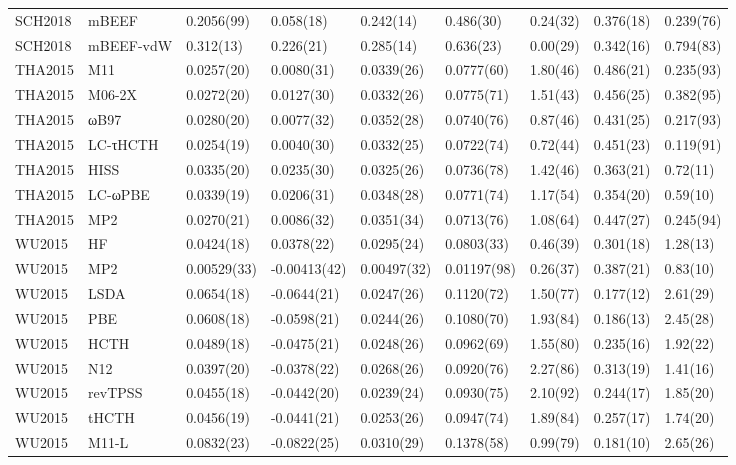\begin{table}[ht]
\begin{tabular}{lllllllll}
  SCH2018 & mBEEF & 0.2056(99) & 0.058(18) & 0.242(14) & 0.486(30) & 0.24(32) & 0.376(18) & 0.239(76) \\ 
  SCH2018 & mBEEF-vdW & 0.312(13) & 0.226(21) & 0.285(14) & 0.636(23) & 0.00(29) & 0.342(16) & 0.794(83) \\ 
  THA2015 & M11 & 0.0257(20) & 0.0080(31) & 0.0339(26) & 0.0777(60) & 1.80(46) & 0.486(21) & 0.235(93) \\ 
  THA2015 & M06-2X & 0.0272(20) & 0.0127(30) & 0.0332(26) & 0.0775(71) & 1.51(43) & 0.456(25) & 0.382(95) \\ 
  THA2015 & ωB97 & 0.0280(20) & 0.0077(32) & 0.0352(28) & 0.0740(76) & 0.87(46) & 0.431(25) & 0.217(93) \\ 
  THA2015 & LC-τHCTH & 0.0254(19) & 0.0040(30) & 0.0332(25) & 0.0722(74) & 0.72(44) & 0.451(23) & 0.119(91) \\ 
  THA2015 & HISS & 0.0335(20) & 0.0235(30) & 0.0325(26) & 0.0736(78) & 1.42(46) & 0.363(21) & 0.72(11) \\ 
  THA2015 & LC-ωPBE & 0.0339(19) & 0.0206(31) & 0.0348(28) & 0.0771(74) & 1.17(54) & 0.354(20) & 0.59(10) \\ 
  THA2015 & MP2 & 0.0270(21) & 0.0086(32) & 0.0351(34) & 0.0713(76) & 1.08(64) & 0.447(27) & 0.245(94) \\ 
  WU2015 & HF & 0.0424(18) & 0.0378(22) & 0.0295(24) & 0.0803(33) & 0.46(39) & 0.301(18) & 1.28(13) \\ 
  WU2015 & MP2 & 0.00529(33) & -0.00413(42) & 0.00497(32) & 0.01197(98) & 0.26(37) & 0.387(21) & 0.83(10) \\ 
  WU2015 & LSDA & 0.0654(18) & -0.0644(21) & 0.0247(26) & 0.1120(72) & 1.50(77) & 0.177(12) & 2.61(29) \\ 
  WU2015 & PBE & 0.0608(18) & -0.0598(21) & 0.0244(26) & 0.1080(70) & 1.93(84) & 0.186(13) & 2.45(28) \\ 
  WU2015 & HCTH & 0.0489(18) & -0.0475(21) & 0.0248(26) & 0.0962(69) & 1.55(80) & 0.235(16) & 1.92(22) \\ 
  WU2015 & N12 & 0.0397(20) & -0.0378(22) & 0.0268(26) & 0.0920(76) & 2.27(86) & 0.313(19) & 1.41(16) \\ 
  WU2015 & revTPSS & 0.0455(18) & -0.0442(20) & 0.0239(24) & 0.0930(75) & 2.10(92) & 0.244(17) & 1.85(20) \\ 
  WU2015 & tHCTH & 0.0456(19) & -0.0441(21) & 0.0253(26) & 0.0947(74) & 1.89(84) & 0.257(17) & 1.74(20) \\ 
  WU2015 & M11-L & 0.0832(23) & -0.0822(25) & 0.0310(29) & 0.1378(58) & 0.99(79) & 0.181(10) & 2.65(26) \\ 

\end{tabular}
\end{table}
